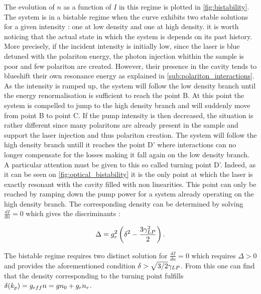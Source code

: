The evolution of $n$ as a function of $I$ in this regime is plotted in \autoref{fig:bistability}. The system is in a bistable regime when the curve exhibits two stable solutions for a given intensity : one at low density and one at high density.
it is worth noticing that the actual state in which the system is depends on its past history. More precisely, if the incident intensity is initially low, since the laser is blue detuned with the polariton energy, the photon injection whithin the sample is poor and few polariton are created. However, their presence in the cavity tends to blueshift their own resonance energy as explained in \autoref{sub:polariton_interactions}. As the intensity is ramped up, the system will follow the low density branch until the energy renormalisation is sufficient to reach the point B. At this point the system is compelled to jump to the high density branch and will suddenly move from point B to point C.
If the pump intensity is then decreased, the situation is rather different since many polaritons are already present in the sample and support the laser injection and thus polariton creation. The system will follow the high density branch untill it reaches the point D' where interactions can no longer compensate for the losses making it fall again on the low density branch. A particular attention must be given to this so called turning point D'. Indeed, as it can be seen on \autoref{fig:optical_bistability} it is the only point at which the laser is exactly resonant with the cavity filled with non linearities.
This point can only be reached by ramping down the pump power for a system already operating on the high density branch. The corresponding density can be determined by solving $\frac{dI}{dn}=0$ which gives the discriminants :

\begin{equation}
    \Delta = g_{e}^2 \left( \delta^2 - \dfrac{3\gamma_{LP}^2}{2}\right).
\end{equation}

The bistable regime requires two distinct solution for $\frac{dI}{dn}=0$ which requires $\Delta>0$ and provides the aforementioned condition $\delta>\sqrt{3/2}\gamma_{LP}$.
From this one can find that the density corresponding to the turning point fulfills $\delta(k_p)=g_{eff}n = gn_0+g_rn_r$. 


